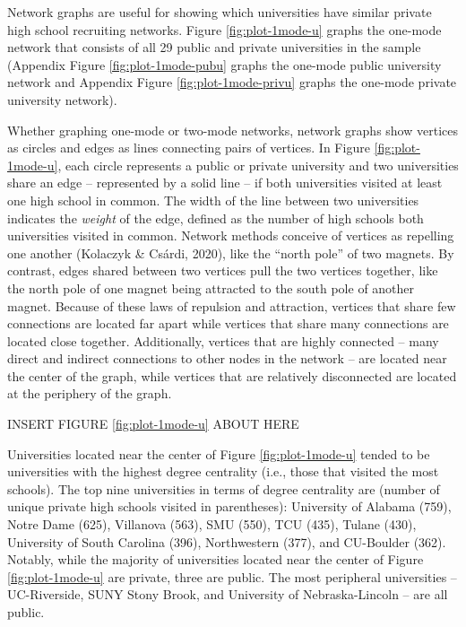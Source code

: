 \documentclass[
  12pt,
]{article}
\begin{document}
Network graphs are useful for showing which universities have similar private high school recruiting networks. Figure \ref{fig:plot-1mode-u} graphs the one-mode network that consists of all 29 public and private universities in the sample (Appendix Figure \ref{fig:plot-1mode-pubu} graphs the one-mode public university network and Appendix Figure \ref{fig:plot-1mode-privu} graphs the one-mode private university network).

Whether graphing one-mode or two-mode networks, network graphs show vertices as circles and edges as lines connecting pairs of vertices. In Figure \ref{fig:plot-1mode-u}, each circle represents a public or private university and two universities share an edge -- represented by a solid line -- if both universities visited at least one high school in common. The width of the line between two universities indicates the \emph{weight} of the edge, defined as the number of high schools both universities visited in common. Network methods conceive of vertices as repelling one another (Kolaczyk \& Csárdi, 2020), like the ``north pole'' of two magnets. By contrast, edges shared between two vertices pull the two vertices together, like the north pole of one magnet being attracted to the south pole of another magnet. Because of these laws of repulsion and attraction, vertices that share few connections are located far apart while vertices that share many connections are located close together. Additionally, vertices that are highly connected -- many direct and indirect connections to other nodes in the network -- are located near the center of the graph, while vertices that are relatively disconnected are located at the periphery of the graph.

INSERT FIGURE \ref{fig:plot-1mode-u} ABOUT HERE

Universities located near the center of Figure \ref{fig:plot-1mode-u} tended to be universities with the highest degree centrality (i.e., those that visited the most schools). The top nine universities in terms of degree centrality are (number of unique private high schools visited in parentheses): University of Alabama (759), Notre Dame (625), Villanova (563), SMU (550), TCU (435), Tulane (430), University of South Carolina (396), Northwestern (377), and CU-Boulder (362). Notably, while the majority of universities located near the center of Figure \ref{fig:plot-1mode-u} are private, three are public. The most peripheral universities -- UC-Riverside, SUNY Stony Brook, and University of Nebraska-Lincoln -- are all public.
\end{document}
